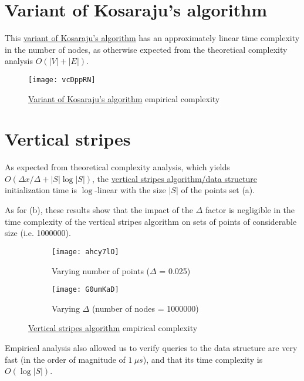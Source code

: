 \section{Variant of Kosaraju's algorithm}
This \hyperref[algorithm-scc-kosaraju-v]{variant of Kosaraju's algorithm} has an approximately linear time complexity in the number of nodes, as otherwise expected from the theoretical complexity analysis $O(|V|+|E|)$.

\begin{figure}[H]
    \centering
    \texttt{[image: vcDppRN]}
    \caption{\hyperref[algorithm-scc-kosaraju-v]{Variant of Kosaraju's algorithm} empirical complexity}
\end{figure}

\section{Vertical stripes}

As expected from theoretical complexity analysis, which yields $O(\Delta x / \Delta + |S| \log |S|)$, the \hyperref[algorithm-vstripes]{vertical stripes algorithm/data structure} initialization time is $\log$-linear with the size $|S|$ of the points set (a).\par
As for (b), these results show that the impact of the $\Delta$ factor is negligible in the time complexity of the vertical stripes algorithm on sets of points of considerable size (i.e. 1000000).

\begin{figure}[H]
    \centering
    \begin{subfigure}{0.49\textwidth}
        \centering
        \texttt{[image: ahcy7lO]}
        \caption{Varying number of points ($\Delta$ = 0.025)}
    \end{subfigure}
    \begin{subfigure}{0.49\textwidth}
        \centering
        \texttt{[image: G0umKaD]}
        \caption{Varying $\Delta$ (number of nodes = 1000000)}
    \end{subfigure}
    \caption{\hyperref[algorithm-vstripes]{Vertical stripes algorithm} empirical complexity}
\end{figure}
\pagebreak
Empirical analysis also allowed us to verify queries to the data structure are very fast (in the order of magnitude of $\SI{1}{\mu s}$), and that its time complexity is $O(\log |S|)$.

